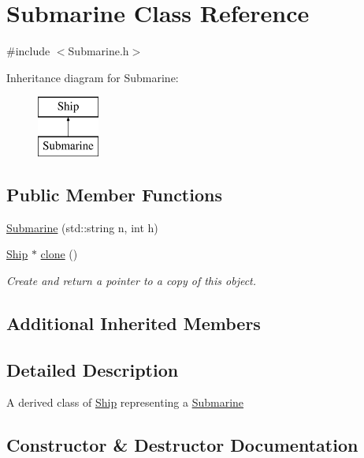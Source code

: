 \hypertarget{class_submarine}{}\section{Submarine Class Reference}
\label{class_submarine}


{\ttfamily \#include $<$Submarine.\+h$>$}

Inheritance diagram for Submarine\+:\begin{figure}[H]
\begin{center}
\leavevmode
\includegraphics[height=2.000000cm]{class_submarine}
\end{center}
\end{figure}
\subsection*{Public Member Functions}
\begin{DoxyCompactItemize}
\item 
\hyperlink{class_submarine_ac59d1fd118990f8173121e27926a1ce0}{Submarine} (std\+::string n, int h)
\item 
\hypertarget{class_submarine_a1affdf9e8e3f14ddf2d2ea04157506b2}{}\hyperlink{class_ship}{Ship} $\ast$ \hyperlink{class_submarine_a1affdf9e8e3f14ddf2d2ea04157506b2}{clone} ()\label{class_submarine_a1affdf9e8e3f14ddf2d2ea04157506b2}

\begin{DoxyCompactList}\small\item\em Create and return a pointer to a copy of this object. \end{DoxyCompactList}\end{DoxyCompactItemize}
\subsection*{Additional Inherited Members}


\subsection{Detailed Description}
A derived class of \hyperlink{class_ship}{Ship} representing a \hyperlink{class_submarine}{Submarine} 

\subsection{Constructor \& Destructor Documentation}
\hypertarget{class_submarine_ac59d1fd118990f8173121e27926a1ce0}{}
